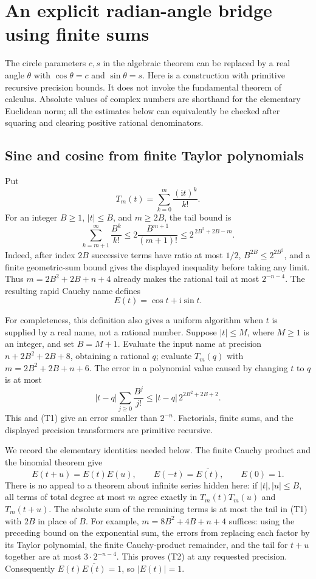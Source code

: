 \section{An explicit radian-angle bridge using finite sums}
\label{sec:finite-trig}

The circle parameters $c,s$ in the algebraic theorem can be replaced by a
real angle $\theta$ with $\cos\theta=c$ and $\sin\theta=s$.  Here is a
construction with primitive recursive precision bounds.  It does not invoke
the fundamental theorem of calculus.  Absolute values of complex numbers
are shorthand for the elementary Euclidean norm; all the estimates below
can equivalently be checked after squaring and clearing positive rational
denominators.

\subsection{Sine and cosine from finite Taylor polynomials}

Put
\[
 T_m(t)=\sum_{k=0}^{m}\frac{(\mathrm i t)^k}{k!}.
\]
For an integer $B\geq1$, $|t|\leq B$, and $m\geq2B$, the tail bound is
\[
 \sum_{k=m+1}^{\infty}\frac{B^k}{k!}
 \leq 2\frac{B^{m+1}}{(m+1)!}
 \leq 2^{\,2B^2+2B-m}.                                      \tag{T1}
\]
Indeed, after index $2B$ successive terms have ratio at most $1/2$,
$B^{2B}\leq2^{2B^2}$, and a finite geometric-sum bound gives the displayed
inequality before taking any limit.  Thus
$m=2B^2+2B+n+4$ already makes the rational tail at most $2^{-n-4}$.
The resulting rapid Cauchy name defines
\[
 E(t)=\cos t+\mathrm i\sin t.
\]

For completeness, this definition also gives a uniform algorithm when
$t$ is supplied by a real name, not a rational number.  Suppose
$|t|\leq M$, where $M\geq1$ is an integer, and set $B=M+1$.
Evaluate the input name at precision
$n+2B^2+2B+8$, obtaining a rational $q$; evaluate $T_m(q)$ with
$m=2B^2+2B+n+6$.  The error in a polynomial value caused by changing
$t$ to $q$ is at most
\[
 |t-q|\sum_{j\geq0}\frac{B^j}{j!}
 \leq |t-q|\,2^{2B^2+2B+2}.
\]
This and (T1) give an error smaller than $2^{-n}$.  Factorials, finite
sums, and the displayed precision transformers are primitive recursive.

We record the elementary identities needed below.  The finite Cauchy
product and the binomial theorem give
\[
 E(t+u)=E(t)E(u),\qquad E(-t)=\overline{E(t)},\qquad E(0)=1.   \tag{T2}
\]
There is no appeal to a theorem about infinite series hidden here: if
$|t|,|u|\leq B$, all terms of total degree at most $m$ agree exactly in
$T_m(t)T_m(u)$ and $T_m(t+u)$.  The absolute sum of the remaining terms is
at most the tail in (T1) with $2B$ in place of $B$.  For example,
$m=8B^2+4B+n+4$ suffices: using the preceding bound on the exponential
sum, the errors from replacing each factor by its Taylor polynomial,
the finite Cauchy-product remainder, and the tail for $t+u$ together
are at most $3\cdot2^{-n-4}$.  This proves (T2) at any requested
precision.  Consequently
$E(t)\overline{E(t)}=1$, so $|E(t)|=1$.

